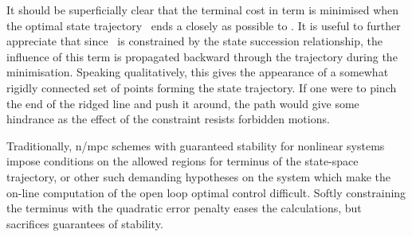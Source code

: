 It should be superficially clear that the terminal cost in  term is minimised
when the optimal state trajectory \oq\ ends a closely as possible to \biy. It is
useful to further appreciate that since \oq\ is constrained by the state
succession relationship, the influence of this term is propagated backward
through the trajectory during the minimisation. Speaking qualitatively, this
gives the appearance of a somewhat rigidly connected set of points forming the
state trajectory. If one were to pinch the end of the ridged line and push it
around, the path would give some hindrance as the effect of the constraint
resists forbidden motions.

Traditionally, \ac{n/mpc} schemes with guaranteed stability for nonlinear
systems impose conditions on the allowed regions for terminus of the state-space
trajectory, or other such demanding hypotheses on the system which make the
on-line computation of the open loop optimal control difficult. Softly
constraining the terminus with the quadratic error penalty eases the
calculations, but sacrifices guarantees of stability.
